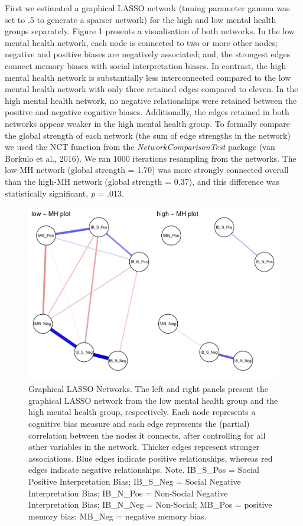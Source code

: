\documentclass[man,floatsintext]{apa6}
\begin{document}
First we estimated a graphical LASSO network (tuning parameter gamma was set to .5 to generate a sparser network) for the high and low mental health groups separately. Figure 1 presents a visualisation of both networks. In the low mental health network, each node is connected to two or more other nodes; negative and positive biases are negatively associated; and, the strongest edges connect memory biases with social interpretation biases. In contrast, the high mental health network is substantially less interconnected compared to the low mental health network with only three retained edges compared to eleven. In the high mental health network, no negative relationships were retained between the positive and negative cognitive biases. Additionally, the edges retained in both networks appear weaker in the high mental health group. To formally compare the global strength of each network (the sum of edge strengths in the network) we used the NCT function from the \emph{NetworkComparisonTest} package (van Borkulo et al., 2016). We ran 1000 iterations resampling from the networks. The low-MH network (global strength = 1.70) was more strongly connected overall than the high-MH network (global strength = 0.37), and this difference was statistically significant, \emph{p} = .013.

\begin{figure}
\centering
\includegraphics{script_files/figure-latex/unnamed-chunk-1-1.pdf}
\caption{\label{fig:unnamed-chunk-1}Graphical LASSO Networks. The left and right panels present the graphical LASSO network from the low mental health group and the high mental health group, respectively. Each node represents a cognitive bias measure and each edge represents the (partial) correlation between the nodes it connects, after controlling for all other variables in the network. Thicker edges represent stronger associations. Blue edges indicate positive relationships, whereas red edges indicate negative relationships.
Note. IB\_S\_Pos = Social Positive Interpretation Bias; IB\_S\_Neg = Social Negative Interpretation Bias; IB\_N\_Pos = Non-Social Negative Interpretation Bias; IB\_N\_Neg = Non-Social; MB\_Pos = positive memory bias; MB\_Neg = negative memory bias.}
\end{figure}
\end{document}
